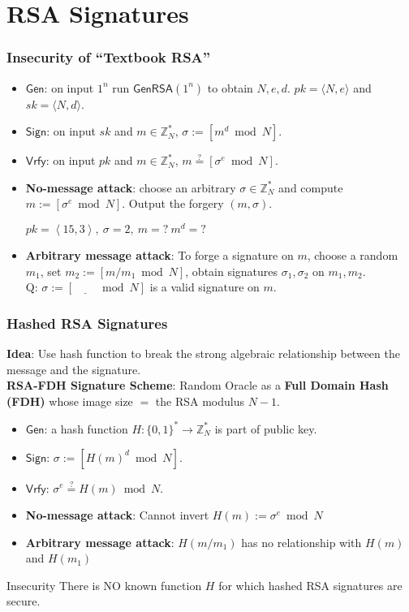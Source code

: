 \section{RSA Signatures}
\begin{frame}\frametitle{Insecurity of ``Textbook RSA''}
\begin{construction}
\begin{itemize}
\item $\mathsf{Gen}$: on input $1^n$ run $\mathsf{GenRSA}(1^n)$ to obtain $N,e,d$. $pk = \langle N,e \rangle$ and $sk = \langle N,d \rangle$.
\item $\mathsf{Sign}$: on input $sk$ and $m \in \mathbb{Z}^*_N$, $\sigma:= [m^d \bmod N]$.
\item $\mathsf{Vrfy}$: on input $pk$ and $m \in \mathbb{Z}^*_N$, $m \overset{?}{=} [\sigma^e \bmod N]$.
\end{itemize}
\end{construction}
\begin{itemize}
\item \textbf{No-message attack}:
choose an arbitrary $\sigma \in \mathbb{Z}^*_N$ and compute $m := [\sigma^e \bmod N]$. Output the forgery $(m,\sigma)$.
\begin{exampleblock}{$pk = \left<15, 3\right>,\ \sigma = 2,\ m = ?\ m^{d} = ?$}
\end{exampleblock}
\item \textbf{Arbitrary message attack}:
To forge a signature on $m$, choose a random $m_1$, set $m_2 := [m/m_1 \bmod N]$,  obtain signatures $\sigma_1, \sigma_2$ on $m_1, m_2$. \\
\alert{Q: $\sigma := [\underline{\qquad} \bmod N]$ is a valid signature on $m$.}
\end{itemize}
\end{frame}
\begin{frame}\frametitle{Hashed RSA Signatures}
\textbf{Idea}: Use hash function to break the strong algebraic relationship between the message and the signature. \\
\textbf{RSA-FDH Signature Scheme}: Random Oracle as a \textbf{Full Domain Hash (FDH)} whose image size $=$ the RSA modulus $N-1$.
\begin{itemize}
\item $\mathsf{Gen}$: a hash function $H : \{0,1\}^* \to \mathbb{Z}_N^*$ is part of public key.
\item $\mathsf{Sign}$: $\sigma := [H(m)^d \bmod N]$.
\item $\mathsf{Vrfy}$: $\sigma^e \overset{?}{=} H(m) \bmod N$.
\item \textbf{No-message attack}: Cannot invert $H(m) := \sigma^e \bmod N$
\item \textbf{Arbitrary message attack}: $H(m/m_1)$ has no relationship with $H(m)$ and $H(m_1)$
\end{itemize}
\begin{alertblock}{Insecurity}
There is NO known function $H$ for which hashed RSA signatures are secure.
\end{alertblock}
\end{frame}

